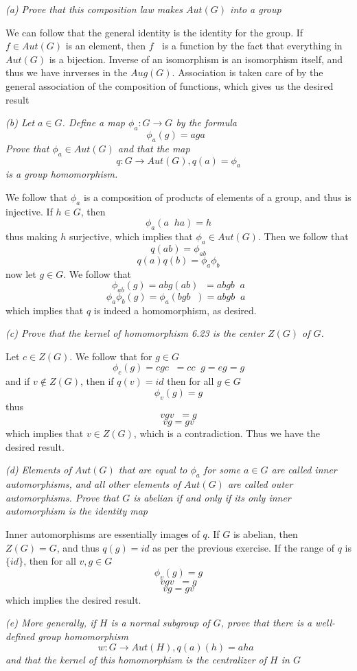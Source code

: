 \documentclass[11pt,oneside,titlepage]{book}
\DeclareMathOperator \inv {^{-1}}
\newcommand{\set}[1]{\{ #1 \}}
\begin{document}
\textit{(a) Prove that this composition law makes $Aut(G)$ into a
group}

We can follow that the general identity is the identity for the group.
If $f \in Aut(G)$ is an element, then $f\inv$ is a function by the
fact that everything in $Aut(G)$ is a bijection. Inverse of an
isomorphism is an isomorphism itself, and thus we have inrverses in
the $Aug(G)$.  Association is taken care of by the general association
of the composition of functions, which gives us the desired result

\textit{(b) Let $a \in G$. Define a map $\phi_a: G \to G$ by the
  formula
  $$\phi_a(g) = a g a\inv$$
  Prove that $\phi_a \in Aut(G)$ and that the map
  $$q: G \to Aut(G), q(a) = \phi_a$$
  is a group homomorphism.
}

We follow that $\phi_a$ is a composition of products of elements of a
group, and thus is injective. If $h \in G$, then
$$\phi_a(a\inv h a) = h$$
thus making $h$ surjective, which implies that $\phi_a \in Aut(G)$.
Then we follow that
$$q(ab) = \phi_{ab}$$
$$q(a)q(b) = \phi_a\phi_b$$
now let $g \in G$. We follow that
$$\phi_{ab}(g) = ab g(ab)\inv = abgb\inv a$$
$$\phi_{a}\phi_{b}(g) = \phi_a(bgb\inv) = a b g b\inv a\inv$$
which implies that $q$ is indeed a homomorphism, as desired.

\textit{(c) Prove that the kernel of homomorphism 6.23 is the center
  $Z(G)$ of $G$.}

Let $c \in Z(G)$. We follow that for $g \in G$
$$\phi_c(g) = c g c\inv = c c\inv g = eg = g$$
and if $v \notin Z(G)$, then if $q(v) = id$ then for all $g \in G$
$$\phi_v(g) = g$$
thus
$$v g v\inv = g$$
$$v g = gv$$
which implies that $v \in Z(G)$, which is a contradiction. Thus we
have the desired result.

\textit{(d) Elements of $Aut(G)$ that are equal to $\phi_a$ for some
  $a \in G$ are called inner automorphisms, and all other elements of
  $Aut(G)$ are called outer automorphisms. Prove that $G$ is abelian if
  and only if its only inner automorphism is the identity map}

Inner automorphisms are essentially images of $q$.  If $G$ is abelian,
then $Z(G) = G$, and thus $q(g) = id$ as per the previous exercise. If
the range of $q$ is $\set{id}$, then for all $v ,g \in G$
$$\phi_v(g) = g$$
$$v g v\inv = g$$
$$v g  = gv$$
which implies the desired result.

\textit{(e) More generally, if $H$ is a normal subgroup of $G$, prove that
  there is a well-defined group homomorphism
  $$w: G \to Aut(H), q(a)(h) = a h a\inv $$
  and that the kernel of this homomorphism is the centralizer of $H$ in $G$
}
\end{document}

